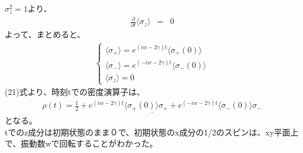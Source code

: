 \documentclass[10pt]{jreport}
\begin{document}
$\sigma_z^2 =1$より、
\begin{eqnarray}
\frac{\partial}{\partial t} \langle \sigma_z \rangle &=& 0
\end{eqnarray}
よって、まとめると、
\begin{eqnarray}
\left\{
\begin{array}{lll}
\langle \sigma_+ \rangle = e^{(iw-2\gamma)t} \langle \sigma_+(0) \rangle  \\
\langle \sigma_- \rangle = e^{(-iw-2\gamma)t} \langle \sigma_-(0) \rangle  \\
\langle \sigma_z \rangle = 0
\end{array}
\right.
\end{eqnarray}
(21)式より、時刻tでの密度演算子は、
\begin{eqnarray}
\underline{\rho(t) = \frac{1}{2}+e^{(iw-2\gamma)t} \langle \sigma_+(0)\rangle\sigma_+ +  e^{(-iw-2\gamma)t} \langle \sigma_-(0)\rangle \sigma_- }
\end{eqnarray}
となる。\\
tでのz成分は初期状態のまま０で、初期状態のx成分の1/2のスピンは、xy平面上で、振動数wで回転することがわかった。
\end{document}
